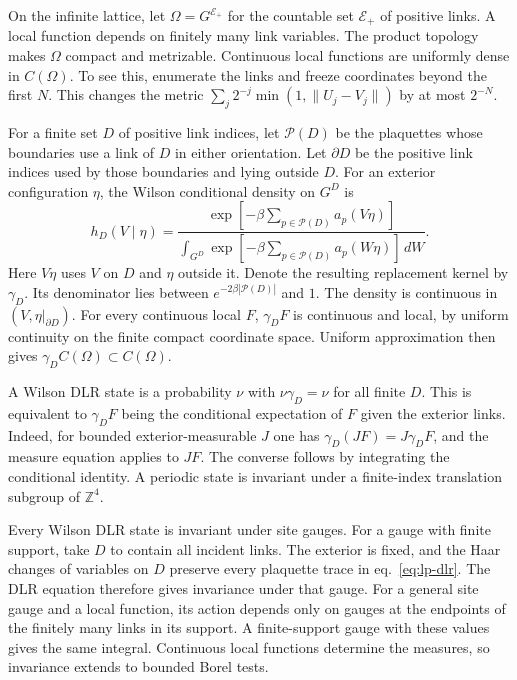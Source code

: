 \documentclass[11pt,letterpaper,reqno]{amsart}
\numberwithin{equation}{section}
\renewcommand{\eqref}[1]{\textup{eq.~\ref{#1}}}
\theoremstyle{definition}
\theoremstyle{remark}
\begin{document}
On the infinite lattice, let \(\Omega=G^{\mathcal E_+}\) for the countable
set \(\mathcal E_+\) of positive links. A local function depends on
finitely many link variables. The product topology makes \(\Omega\)
compact and metrizable. Continuous local functions are uniformly dense
in \(C(\Omega)\). To see this, enumerate the links and freeze
coordinates beyond the first \(N\). This changes the metric
\(\sum_j 2^{-j}\min(1,\|U_j-V_j\|)\) by at most \(2^{-N}\).

For a finite set \(D\) of positive link indices, let \(\mathcal P(D)\)
be the plaquettes whose boundaries use a link of \(D\) in either
orientation. Let \(\partial D\) be the positive link indices used
by those boundaries and lying outside \(D\). For an exterior configuration \(\eta\), the Wilson
conditional density on \(G^D\) is
\begin{equation}\label{eq:lp-dlr}
 h_D(V\mid\eta)=
 \frac{\exp[-\beta\sum_{p\in\mathcal P(D)}a_p(V\eta)]}
 {\int_{G^D}\exp[-\beta\sum_{p\in\mathcal P(D)}a_p(W\eta)]\,dW}.
\end{equation}
Here \(V\eta\) uses \(V\) on \(D\) and \(\eta\) outside it.
Denote the resulting replacement kernel by \(\gamma_D\).
Its denominator lies between \(e^{-2\beta|\mathcal P(D)|}\) and \(1\).
The density is continuous in \((V,\eta|_{\partial D})\).
For every continuous local \(F\), \(\gamma_D F\) is continuous and local,
by uniform continuity on the finite compact coordinate space.
Uniform approximation then gives \(\gamma_D C(\Omega)\subset C(\Omega)\).

A Wilson DLR state is a probability \(\nu\) with
\(\nu\gamma_D=\nu\) for all finite \(D\). This is equivalent to
\(\gamma_DF\) being the conditional expectation of \(F\) given the
exterior links. Indeed, for bounded exterior-measurable \(J\) one has
\(\gamma_D(JF)=J\gamma_DF\), and the measure equation applies to \(JF\).
The converse follows by integrating the conditional identity.
A periodic state is invariant under a finite-index translation
subgroup of \(\mathbb Z^4\).

Every Wilson DLR state is invariant under site gauges.
For a gauge with finite support, take \(D\) to contain all incident
links. The exterior is fixed, and the Haar changes of variables on
\(D\) preserve every plaquette trace in \eqref{eq:lp-dlr}.
The DLR equation therefore gives invariance under that gauge.
For a general site gauge and a local function, its action depends only
on gauges at the endpoints of the finitely many links in its support.
A finite-support gauge with these values gives the same integral.
Continuous local functions determine the measures, so invariance
extends to bounded Borel tests.
\end{document}
